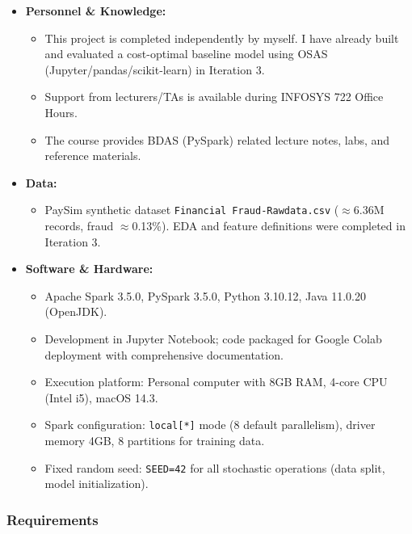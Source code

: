 \documentclass[sigplan,screen]{acmart}
\begin{document}
\begin{itemize}
\item \textbf{Personnel \& Knowledge:}
\begin{itemize}
\item This project is completed independently by myself. I have already built and evaluated a cost-optimal baseline model using OSAS (Jupyter/\allowbreak pandas/\allowbreak scikit-learn) in Iteration 3.
\item Support from lecturers/TAs is available during INFOSYS 722 Office Hours.
\item The course provides BDAS (PySpark) related lecture notes, labs, and reference materials.
\end{itemize}
\item \textbf{Data:}
\begin{itemize}
\item PaySim synthetic dataset \texttt{Financial Fraud-Rawdata.csv} ($\approx$6.36M records, fraud $\approx$0.13\%). EDA and feature definitions were completed in Iteration 3.
\end{itemize}
\item \textbf{Software \& Hardware:}
\begin{itemize}
\item Apache Spark 3.5.0, PySpark 3.5.0, Python 3.10.12, Java 11.0.20 (OpenJDK).
\item Development in Jupyter Notebook; code packaged for Google Colab deployment with comprehensive documentation.
\item Execution platform: Personal computer with 8GB RAM, 4-core CPU (Intel i5), macOS 14.3.
\item Spark configuration: \texttt{local[*]} mode (8 default parallelism), driver memory 4GB, 8 partitions for training data.
\item Fixed random seed: \texttt{SEED=42} for all stochastic operations (data split, model initialization).
\end{itemize}
\end{itemize}

\subsubsection{Requirements}
\end{document}
